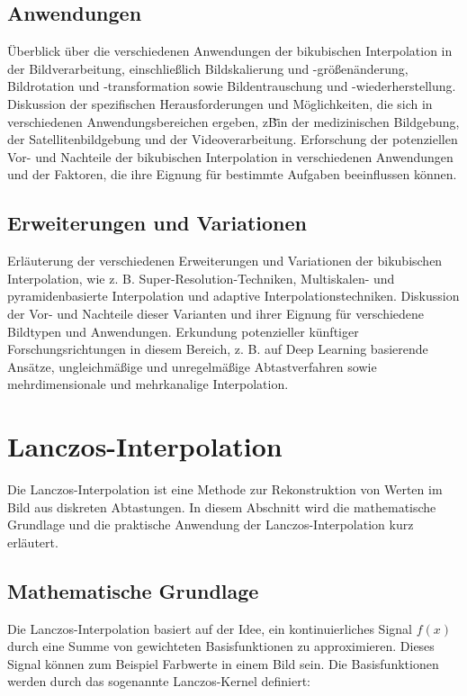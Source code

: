     \subsection{Anwendungen}

    Überblick über die verschiedenen Anwendungen der bikubischen Interpolation in der Bildverarbeitung, einschließlich Bildskalierung und -größenänderung, Bildrotation und -transformation sowie Bildentrauschung und -wiederherstellung.
    Diskussion der spezifischen Herausforderungen und Möglichkeiten, die sich in verschiedenen Anwendungsbereichen ergeben,
    z\.B\. in der medizinischen Bildgebung, der Satellitenbildgebung und der Videoverarbeitung.
    Erforschung der potenziellen Vor- und Nachteile der bikubischen Interpolation in verschiedenen Anwendungen und der Faktoren, die ihre Eignung für bestimmte Aufgaben beeinflussen können.

    \subsection{Erweiterungen und Variationen}

    Erläuterung der verschiedenen Erweiterungen und Variationen der bikubischen Interpolation, wie z.
    B. Super-Resolution-Techniken, Multiskalen- und pyramidenbasierte Interpolation und adaptive Interpolationstechniken.
    Diskussion der Vor- und Nachteile dieser Varianten und ihrer Eignung für verschiedene Bildtypen und Anwendungen.
    Erkundung potenzieller künftiger Forschungsrichtungen in diesem Bereich, z.
    B. auf Deep Learning basierende Ansätze, ungleichmäßige und unregelmäßige Abtastverfahren sowie mehrdimensionale und mehrkanalige Interpolation.


\section{Lanczos-Interpolation}
    Die Lanczos-Interpolation ist eine Methode zur Rekonstruktion von Werten im Bild aus diskreten Abtastungen. 
    In diesem Abschnitt wird die mathematische Grundlage und die praktische Anwendung der Lanczos-Interpolation kurz erläutert.

\subsection{Mathematische Grundlage}

    Die Lanczos-Interpolation basiert auf der Idee, ein kontinuierliches Signal $f(x)$ durch eine Summe von gewichteten Basisfunktionen zu approximieren. 
    Dieses Signal können zum Beispiel Farbwerte in einem Bild sein.
    Die Basisfunktionen werden durch das sogenannte Lanczos-Kernel definiert:

